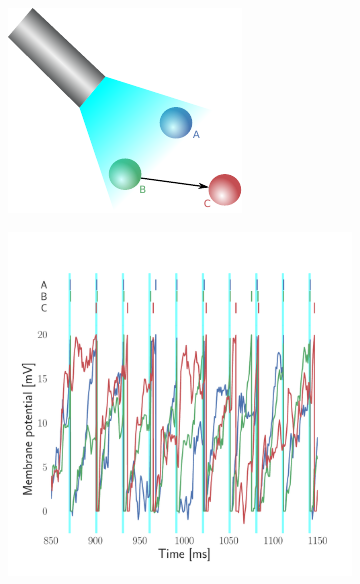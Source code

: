 \documentclass[11pt]{article}
\begin{document}
\begin{figure} 
\makeatletter
\renewcommand\p@subfigure{}
\makeatother
\begin{subfigure}{0.485\textwidth} \includegraphics[scale=1.3]{simple}
\caption{} \label{fig:intro:1}
\end{subfigure}\hfill
\begin{subfigure}{0.485\textwidth} \includegraphics[scale=.25]{traces}
\caption{} \label{fig:intro:2}
\end{subfigure}


\end{figure}
\end{document}
